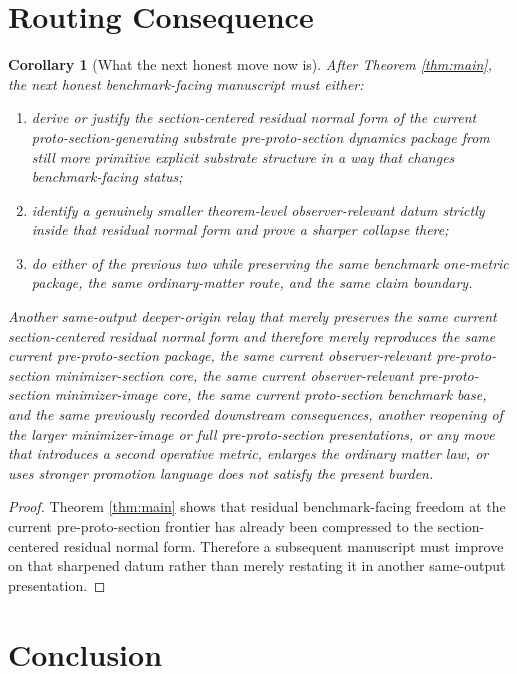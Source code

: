 \documentclass[11pt]{article}
\newtheorem{corollary}{Corollary}
\begin{document}
\section{Routing Consequence}

\begin{corollary}[What the next honest move now is]
\label{cor:next}
After Theorem \ref{thm:main}, the next honest benchmark-facing manuscript must either:
\begin{enumerate}
    \item derive or justify the section-centered residual normal form of the current proto-section-generating substrate pre-proto-section dynamics package from still more primitive explicit substrate structure in a way that changes benchmark-facing status;
    \item identify a genuinely smaller theorem-level observer-relevant datum strictly inside that residual normal form and prove a sharper collapse there;
    \item do either of the previous two while preserving the same benchmark one-metric package, the same ordinary-matter route, and the same claim boundary.
\end{enumerate}
Another same-output deeper-origin relay that merely preserves the same current section-centered residual normal form and therefore merely reproduces the same current pre-proto-section package, the same current observer-relevant pre-proto-section minimizer-section core, the same current observer-relevant pre-proto-section minimizer-image core, the same current proto-section benchmark base, and the same previously recorded downstream consequences, another reopening of the larger minimizer-image or full pre-proto-section presentations, or any move that introduces a second operative metric, enlarges the ordinary matter law, or uses stronger promotion language does not satisfy the present burden.
\end{corollary}

\begin{proof}
Theorem \ref{thm:main} shows that residual benchmark-facing freedom at the current pre-proto-section frontier has already been compressed to the section-centered residual normal form. Therefore a subsequent manuscript must improve on that sharpened datum rather than merely restating it in another same-output presentation.
\end{proof}

\section{Conclusion}
\end{document}

